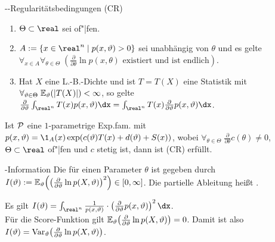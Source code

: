 \begin{Def}{--Regularitätsbedingungen (CR)}
    \begin{enumerate}
        \item
        $\Theta \subset \real$ sei of"|fen.

        \item
        $A := \{x \in \real^n \;|\; p(x, \theta) > 0\}$ sei unabhängig von $\theta$ und es gelte\\
        $\forall_{x \in A} \forall_{\theta \in \Theta}\; (\frac{\partial}{\partial \theta}
        \ln p(x, \theta) \text{ existiert und ist endlich})$.

        \item
        Hat $X$ eine L.-B.-Dichte und ist $T = T(X)$ eine Statistik mit
        $\forall_{\theta \in \Theta}\; \EE_\theta(|T(X)|) < \infty$, so gelte
        $\frac{\partial}{\partial \theta} \int_{\real^n} T(x) p(x, \theta) \dx =
        \int_{\real^n} T(x) \frac{\partial}{\partial \theta} p(x, \theta) \dx$.
    \end{enumerate}
\end{Def}

\begin{Bem}
    Ist $\P$ eine $1$-parametrige Exp.fam. mit
    $p(x, \theta) = \1_A(x) \exp(c(\theta)T(x) + d(\theta) + S(x))$, wobei
    $\forall_{\theta \in \Theta}\; \frac{\partial}{\partial \theta} c(\theta) \not= 0$,
    $\Theta \subset \real$ of"|fen und $c$ stetig ist, dann ist (CR) erfüllt.
\end{Bem}

\linie

\begin{Def}{-Information}
    Die  für einen Parameter $\theta$ ist gegeben durch\\
    $I(\theta) := \EE_\theta\!\left(\left(\frac{\partial}{\partial \theta} \ln p(X, \theta)
    \right)^2\right) \in [0, \infty]$.
    Die partielle Ableitung heißt .
\end{Def}

\begin{Bem}
    Es gilt
    $I(\theta) = \int_{\real^n} \frac{1}{p(x, \theta)} \cdot \left(\frac{\partial}{\partial \theta}
    p(x, \theta)\right)^2 \dx$.\\
    Für die Score-Funktion gilt
    $\EE_\theta\!\left(\frac{\partial}{\partial \theta} \ln p(X, \theta)\right) = 0$.
    Damit ist also $I(\theta) =
    \Var_\theta\!\left(\frac{\partial}{\partial \theta} \ln p(X, \theta)\right)$.
\end{Bem}

